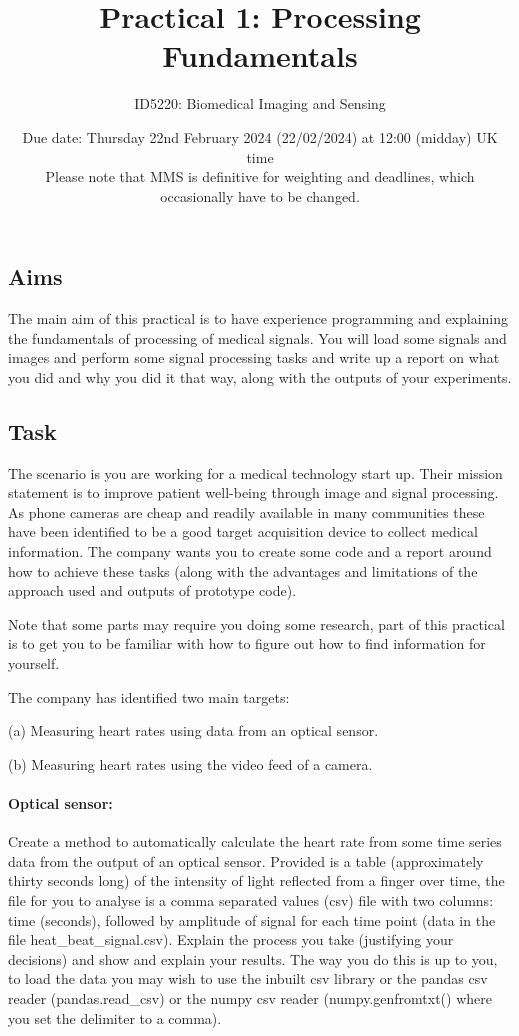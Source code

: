 \documentclass[a4paper,11pt]{article}
\begin{document}
\title{Practical 1: Processing Fundamentals}
\author{ID5220: Biomedical Imaging and Sensing}
\date{Due date: Thursday 22nd February 2024 (22/02/2024) at 12:00 (midday) UK time\\
Please note that MMS is definitive for weighting and deadlines, which occasionally have to be changed.} 

\maketitle

\subsection*{Aims}

The main aim of this practical is to have experience programming and explaining the fundamentals of processing of medical signals. 
You will load some signals and images and perform some signal processing tasks and write up a report on what you did and why you did it that way, along with the outputs of your experiments. 

\subsection*{Task}
The scenario is you are working for a medical technology start up. Their mission statement is to improve patient well-being through image and signal processing. As phone cameras are cheap and readily available in many communities these have been identified to be a good target acquisition device to collect medical information. The company wants you to create some code and a report around how to achieve these tasks (along with the advantages and limitations of the approach used and outputs of prototype code).

Note that some parts may require you doing some research, part of this practical is to get you to be familiar with how to figure out how to find information for yourself.

The company has identified two main targets: 

(a) Measuring heart rates using data from an optical sensor. 

(b) Measuring heart rates using the video feed of a camera. 


\paragraph{Optical sensor:}
Create a method to automatically calculate the heart rate from some time series data from the output of an optical sensor. 
Provided is a table (approximately thirty seconds long) of the intensity of light reflected from a finger over time, the file for you to analyse is a comma separated values (csv) file with two columns: time (seconds), followed by amplitude of signal for each time point (data in the file heat\_beat\_signal.csv). Explain the process you take (justifying your decisions) and show and explain your results. The way you do this is up to you, to load the data you may wish to use the inbuilt csv library or the pandas csv reader (pandas.read\_csv) or the numpy csv reader (numpy.genfromtxt() where you set the delimiter to a comma).
\end{document}
